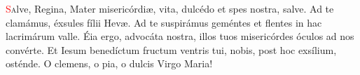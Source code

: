 \lettrine[lines=2]{\textcolor{red}{S}}alve, Regina, Mater misericórdi{\ae}, vita, dulcédo et spes nostra, salve. Ad te clamámus, éxsules fílii Hev{\ae}.
Ad te suspirámus geméntes et flentes in hac lacrimárum valle. Éia ergo, advocáta nostra, illos tuos misericórdes óculos ad nos convérte.
Et Iesum benedíctum fructum ventris tui, nobis, post hoc exsílium, osténde. O clemens, o pia, o dulcis Virgo Maria!
